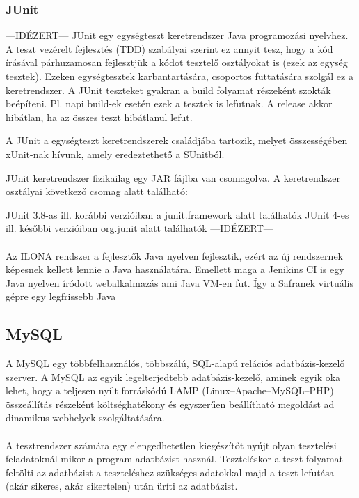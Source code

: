 \subsubsection{JUnit}
---IDÉZERT---
JUnit egy egységteszt keretrendszer Java programozási nyelvhez. A teszt vezérelt fejlesztés (TDD) szabályai szerint ez annyit tesz, hogy a kód írásával párhuzamosan fejlesztjük a kódot tesztelő osztályokat is (ezek az egység tesztek). Ezeken egységtesztek karbantartására, csoportos futtatására szolgál ez a keretrendszer. A JUnit teszteket gyakran a build folyamat részeként szokták beépíteni. Pl. napi build-ek esetén ezek a tesztek is lefutnak. A release akkor hibátlan, ha az összes teszt hibátlanul lefut.

A JUnit a egységteszt keretrendszerek családjába tartozik, melyet összességében xUnit-nak hívunk, amely eredeztethető a SUnitból.

JUnit keretrendszer fizikailag egy JAR fájlba van csomagolva. A keretrendszer osztályai következő csomag alatt található:

JUnit 3.8-as ill. korábbi verzióiban a junit.framework alatt találhatók
JUnit 4-es ill. későbbi verzióiban org.junit alatt találhatók
---IDÉZERT---

\paragraph{}
Az ILONA rendszer a fejlesztők Java nyelven fejlesztik, ezért az új rendszernek képesnek kellett lennie a Java használatára. 
Emellett maga a Jenikins CI is egy Java nyelven íródott webalkalmazás ami Java VM-en fut. 
Így a Safranek virtuális gépre egy legfrissebb Java 

\subsection{MySQL}
A MySQL egy többfelhasználós, többszálú, SQL-alapú relációs adatbázis-kezelő szerver.
A MySQL az egyik legelterjedtebb adatbázis-kezelő, aminek egyik oka lehet, hogy a teljesen nyílt forráskódú LAMP (Linux–Apache–MySQL–PHP) összeállítás részeként költséghatékony és egyszerűen beállítható megoldást ad dinamikus webhelyek szolgáltatására.

\paragraph{}
A tesztrendszer számára egy elengedhetetlen kiegészítőt nyújt olyan tesztelési feladatoknál mikor a program adatbázist használ. 
Teszteléskor a teszt folyamat feltölti az adatbázist a teszteléshez szükséges adatokkal majd a teszt lefutása (akár sikeres, akár sikertelen) után üríti az adatbázist. 



